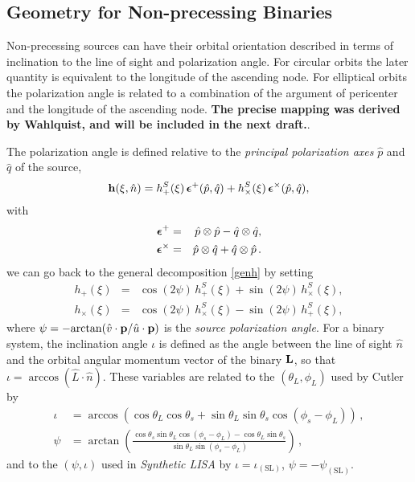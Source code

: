 \documentclass[11pt]{report}
\begin{document}
\subsection{Geometry for Non-precessing Binaries}

Non-precessing sources can have their orbital orientation described in terms of inclination to the line of sight and
polarization angle. For circular orbits the later quantity is equivalent to the longitude of the ascending node.
For elliptical orbits the polarization angle is related to a combination of the argument of pericenter and
the longitude of the ascending node.
{\bf The precise mapping was derived by Wahlquist, and will be included in the next draft.}.

The polarization angle is defined relative to the \emph{principal polarization axes} $\hat{p}$ and $\hat{q}$ of the source,
%
\begin{equation}
{\bf h}(\xi,\hat{n}) = h^S_+(\xi) \, {\mbox{\boldmath$\epsilon$}}^{+}(\hat{p},\hat{q}) +
h^S_\times(\xi) \, {\mbox{\boldmath$\epsilon$}}^{\times}(\hat{p},\hat{q}),
\end{equation}
%
with
%
\begin{eqnarray}
{\mbox{\boldmath$\epsilon$}}^{+} &=& \hat{p}\otimes\hat{p} - \hat{q}\otimes\hat{q} , \nonumber \\
{\mbox{\boldmath$\epsilon$}}^{\times} &=& \hat{p}\otimes\hat{q} + \hat{q}\otimes\hat{p} \, .
\end{eqnarray}
%
we can go back to the general decomposition \eqref{genh} by setting
%
\begin{eqnarray}
h_+(\xi) &=& \cos (2\psi) \, h^S_+(\xi)  + \sin (2 \psi) \, h^S_\times(\xi), \\
h_\times(\xi) &=& \cos (2\psi) \, h^S_\times(\xi)  - \sin (2 \psi) \, h^S_+(\xi),
\end{eqnarray}
%
where $\psi=-{\rm arctan}(\hat{v}\cdot{\bf p}/\hat{u}\cdot{\bf p})$ is the \emph{source polarization angle}.
For a binary system, the inclination angle $\iota$ is defined as the angle between the line of sight
$\hat{n}$ and the orbital angular momentum vector of the binary ${\bf L}$, so that $\iota = \arccos(\hat{L}\cdot
\hat{n})$.
These variables are related to the $(\theta_L,\phi_L)$ used by Cutler~\cite{cutler98} by
%
\begin{equation}
\label{eq:iotatocutler}
\begin{aligned}
\iota &= \arccos\left(\cos\theta_L \cos\theta_s +\sin\theta_L \sin\theta_s \cos(\phi_s -\phi_L) \right) \,, \\
\psi &= \arctan\left( \frac{\cos\theta_s \sin\theta_L \cos(\phi_s-\phi_L) - \cos\theta_L \sin\theta_s}
{\sin\theta_L \sin(\phi_s-\phi_L)} \right)\, ,
\end{aligned}
\end{equation}
%
and to the $(\psi,\iota)$  used in \emph{Synthetic LISA} \cite{synthlisa,vallis2005} by
$\iota = \iota_\mathrm{(SL)}$, $\psi = -\psi_\mathrm{(SL)}$.
\end{document}
